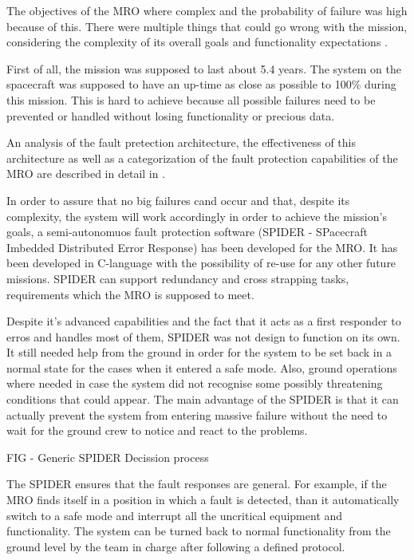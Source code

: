 The objectives of the MRO where complex and the probability of failure was high
because of this. There were multiple things that could go wrong with the
mission, considering the complexity of its overall goals and functionality
expectations  \cite{tvs}.

First of all, the mission was supposed to last about 5.4 years. The system on
the spacecraft was supposed to have an up-time as close as possible to 100\%
during this mission. This is hard to achieve because all possible failures need
to be prevented or handled without losing functionality or precious data.

An analysis of the fault pretection architecture, the effectiveness of this
architecture as well as a categorization of the fault protection capabilities of
the MRO are described in detail in \cite{surv-nasa-mars}.

In order to assure that no big failures cand occur and that, despite its
complexity, the system will work accordingly in order to achieve the mission's
goals, a semi-autonomuos fault protection software (SPIDER - SPacecraft Imbedded
Distributed Error Response) has been developed for the MRO. It has been
developed in C-language with the possibility of re-use for any other future
missions. SPIDER can support redundancy and cross strapping tasks, requirements
which the MRO is supposed to meet.

Despite it's advanced capabilities and the fact that it acts as a first
responder to erros and handles most of them, SPIDER was not design to function
on its own. It still needed help from the ground in order for the system to be
set back in a normal state for the cases when it entered a safe mode. Also,
ground operations where needed in case the system did not recognise some
possibly threatening conditions that could appear. The main advantage of the
SPIDER is that it can actually prevent the system from entering massive failure
without the need to wait for the ground crew to notice and react to the
problems.

FIG - Generic SPIDER Decission process \cite{e-seale}

The SPIDER ensures that the fault responses are general. For example, if the MRO
finds itself in a position in which a fault is detected, than it automatically
switch to a safe mode and interrupt all the uncritical equipment and
functionality. The system can be turned back to normal functionality from the
ground level by the team in charge after following a defined protocol.


